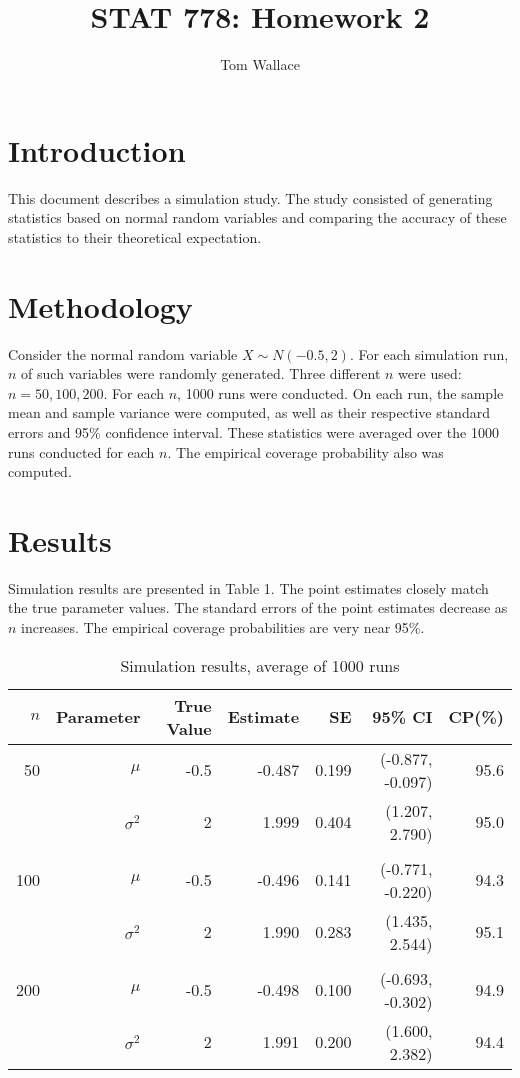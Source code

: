 \documentclass{article}
\author{Tom Wallace}
\title{STAT 778: Homework 2}
\begin{document}
\maketitle

\section{Introduction}
This document describes a simulation study. The study consisted of generating
statistics based on normal random variables and comparing the accuracy of these
statistics to their theoretical expectation.

\section{Methodology}
Consider the normal random variable $X \sim N(-0.5, 2)$. For each simulation
run, $n$ of such variables were randomly generated. Three different $n$ were
used:  $n=50, 100, 200$. For each $n$, 1000 runs were conducted. On each run,
the sample mean and sample variance were computed, as well as their respective standard errors and 95\%
confidence interval. These statistics were averaged over the 1000 runs conducted
for each $n$. The empirical coverage probability also was computed.

\section{Results}
Simulation results are presented in Table 1. The point estimates closely match
the true parameter values. The standard errors of the point estimates decrease
as $n$ increases. The empirical coverage probabilities are very near 95\%. 

\begin{table}[h]
	\centering
	\caption{Simulation results, average of 1000 runs}
	\begin{tabular}{|rrrrrrr|}
		\hline
		$n$&Parameter&True Value&Estimate&SE& 95\% CI&CP(\%)\\
		\hline
		50  & $\mu$ & -0.5 & -0.487   & 0.199& (-0.877, -0.097) & 95.6 \\
		    & $\sigma^2$  & 2 & 1.999 & 0.404 & (1.207, 2.790)  & 95.0 \\
		    &&&&&& \\
		100 & $\mu$ & -0.5 & -0.496 & 0.141 & (-0.771, -0.220) & 94.3 \\
		    & $\sigma^2$ & 2 & 1.990 & 0.283 & (1.435, 2.544) &  95.1\\
		    &&&&&& \\
		200 & $\mu$ & -0.5 & -0.498 & 0.100 & (-0.693, -0.302) & 94.9\\ 
		    & $\sigma^2$ & 2 & 1.991 & 0.200 & (1.600, 2.382) & 94.4 \\
		\hline
	\end{tabular}
\end{table}

	
\end{document}
